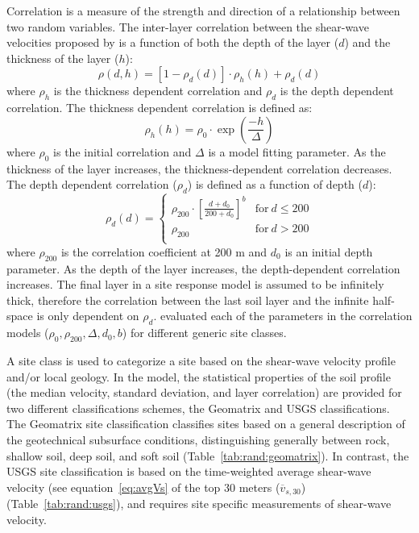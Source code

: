 \documentclass[11pt]{report}
\begin{document}
Correlation is a measure of the strength and direction of a relationship between two random
variables.  The inter-layer correlation between the shear-wave velocities proposed by
\citet{toro:95} is a function of both the depth of the layer ($d$) and the thickness of the layer
($h$):
\begin{equation}
  \rho(d,h) = \left[1 - \rho_d(d)\right] \cdot \rho_h(h) + \rho_d(d)
\end{equation}
where $\rho_h$ is the thickness dependent correlation and $\rho_d$ is the depth dependent
correlation.  The thickness dependent correlation is defined as:
\begin{equation}
  \rho_h(h) = \rho_0 \cdot \exp\left(\frac{-h}{\Delta}\right)
\end{equation}
where $\rho_0$ is the initial correlation and $\Delta$ is a model fitting parameter.  As the
thickness of the layer increases, the thickness-dependent correlation decreases.  The depth
dependent correlation ($\rho_d$) is defined as a function of depth ($d$): 
\begin{equation}
  \rho_d(d) = 
  \left\{
  \begin{array}{ll}
	\rho_{200} \cdot \left[ \frac{d+d_0}{200+d_0} \right]^b & \mathrm{for}\ d \leq 200 \\
	\rho_{200} & \mathrm{for}\ d > 200 \\
  \end{array}
  \right. 
\end{equation}
where $\rho_{200}$ is the correlation coefficient at 200 m and $d_0$ is an initial depth parameter.
As the depth of the layer increases, the depth-dependent correlation increases.  The final layer in
a site response model is assumed to be infinitely thick, therefore the correlation between the last
soil layer and the infinite half-space is only dependent on $\rho_d$.  \citep{toro:95} evaluated
each of the parameters in the correlation models ($\rho_0, \rho_{200}, \Delta, d_0, b$) for
different generic site classes.

A site class is used to categorize a site based on the shear-wave velocity profile and/or local
geology.  In the \citet{toro:95} model, the statistical properties of the soil profile (the median
velocity, standard deviation, and layer correlation) are provided for two different classifications
schemes, the Geomatrix and USGS classifications. The Geomatrix site classification classifies sites
based on a general description of the geotechnical subsurface conditions, distinguishing generally
between rock, shallow soil, deep soil, and soft soil (Table~\ref{tab:rand:geomatrix}).  In contrast,
the USGS site classification is based on the time-weighted average shear-wave velocity (see
equation~\ref{eq:avgVs} of the top 30 meters ($\overline{v}_{s,30}$) (Table~\ref{tab:rand:usgs}),
and requires site specific measurements of shear-wave velocity.
\end{document}
